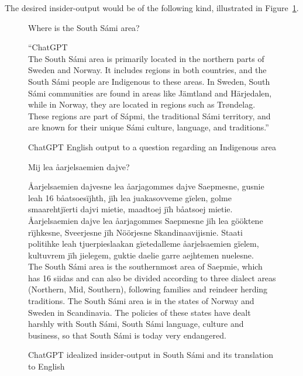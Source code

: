 \documentclass[free]{flammie}
\begin{document}
The desired insider-output would be of the following kind, illustrated in
Figure~\ref{fig:chatgpt-ideal}.

 \begin{figure}
     \centering
\begin{tcolorbox}[width=\linewidth, colframe=openai, colback=ChatGPT!60,
    boxsep=3mm, arc=2mm]
Where is the South Sámi area?\\
\vspace{1.5em}

``ChatGPT\\
The South Sámi area is primarily located in the northern parts of Sweden and
    Norway. It includes regions in both countries, and the South Sámi people are
    Indigenous to these areas. In Sweden, South Sámi communities are found in
    areas like Jämtland and Härjedalen, while in Norway, they are located in
    regions such as Trøndelag. These regions are part of Sápmi, the traditional
    Sámi territory, and are known for their unique Sámi culture, language, and
    traditions.''
\end{tcolorbox}
     \caption{\label{fig:chatgpt-real} ChatGPT English output to a question
     regarding an Indigenous area}
\begin{tcolorbox}[width=\linewidth, colframe=openai, colback=ChatGPT!60,
    boxsep=3mm, arc=2mm] Mij lea åarjelsaemien dajve?\\
\vspace{1.5em}

Åarjelsaemien dajvesne lea åarjagommes dajve Saepmesne, gusnie leah 16
    båatsoesïjhth, jïh lea juakasovveme gïelen, golme smaarehtjïerti dajvi
    mietie, maadtoej jïh båatsoej mietie. Åarjelsaemien dajve lea åarjagommes
    Saepmesne jïh lea gööktene rïjhkesne, Sveerjesne jïh Nöörjesne
    Skandinaavijisnie. Staati politihke leah tjuerpieslaakan gïetedalleme
    åarjelsaemien gïelem, kultuvrem jïh jielegem, guktie daelie garre aejhtemen
    nuelesne. \\

The South Sámi area is the southernmost area of Saepmie, which has 16  siidas
and can also be divided according to three dialect areas (Northern, Mid,
Southern), following families and reindeer herding traditions. The South Sámi
area is in the states of Norway and Sweden in Scandinavia. The policies of these
states have dealt harshly with South Sámi, South Sámi language, culture and
business, so that South Sámi is today very endangered.
  \end{tcolorbox}
 \caption{\label{fig:chatgpt-ideal} ChatGPT idealized insider-output in South
 Sámi and its translation to English}
\end{figure}
\end{document}
